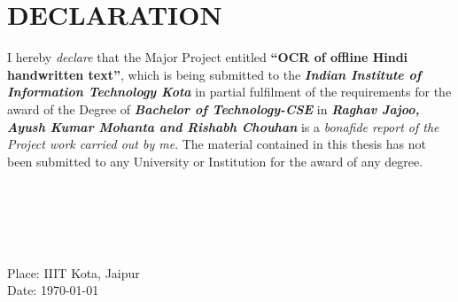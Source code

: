 \chapter*{DECLARATION}
\thispagestyle{empty}

\doublespace

\qquad 

\indent I hereby {\textit{declare}} that the Major Project entitled {\bf \textquotedblleft{OCR of offline Hindi handwritten text\textquotedblright}}, which is being submitted to the {\bf\textit{Indian Institute of Information Technology Kota}} in partial fulfilment of the requirements for the award of the Degree of {\bf\textit{Bachelor of Technology-CSE}} in {\bf\textit{Raghav Jajoo, Ayush Kumar Mohanta and Rishabh Chouhan}} is a {\textit{bonafide report of the Project work carried out by me}}. The material contained in this thesis has not been submitted to any University or Institution for the award of any degree.

\vspace*{1in}
\begin{singlespace}
\hspace*{1.5in} 
\parbox{3in}
{{}\\
{}\\
{}\\
\\
}
\end{singlespace} 

\vspace*{1in}

\noindent Place: IIIT Kota, Jaipur\\
\noindent Date: \today 
\par\newpage

